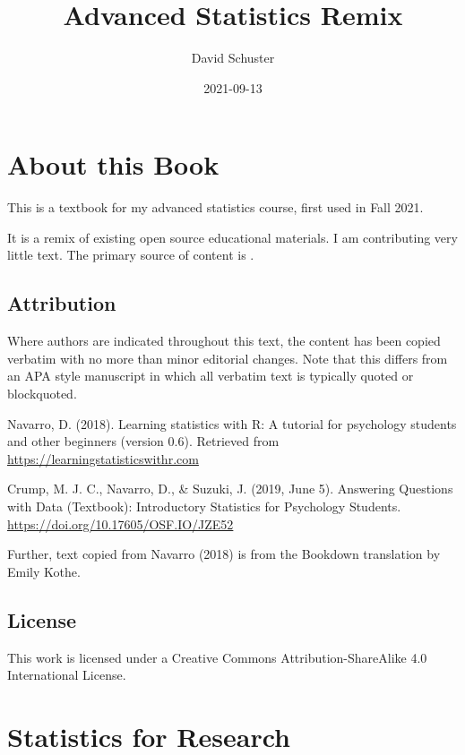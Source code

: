 \documentclass[
]{book}
\title{Advanced Statistics Remix}
\author{David Schuster}
\date{2021-09-13}
\begin{document}
\maketitle

{
\setcounter{tocdepth}{1}
\tableofcontents
}
\hypertarget{about-this-book}{%
\chapter*{About this Book}\label{about-this-book}}

This is a textbook for my advanced statistics course, first used in Fall 2021.

It is a remix of existing open source educational materials. I am contributing very little text. The primary source of content is \citet{Navarro2018}.

\hypertarget{attribution}{%
\section*{Attribution}\label{attribution}}

Where authors are indicated throughout this text, the content has been copied verbatim with no more than minor editorial changes. Note that this differs from an APA style manuscript in which all verbatim text is typically quoted or blockquoted.

Navarro, D. (2018). Learning statistics with R: A tutorial for psychology students and other beginners (version 0.6). Retrieved from \url{https://learningstatisticswithr.com}

Crump, M. J. C., Navarro, D., \& Suzuki, J. (2019, June 5). Answering Questions with Data (Textbook): Introductory Statistics for Psychology Students. \url{https://doi.org/10.17605/OSF.IO/JZE52}

Further, text copied from Navarro (2018) is from the Bookdown translation by Emily Kothe.

\hypertarget{license}{%
\section*{License}\label{license}}

This work is licensed under a Creative Commons Attribution-ShareAlike 4.0 International License.

\hypertarget{statistics-for-research}{%
\chapter{Statistics for Research}\label{statistics-for-research}}
\end{document}
